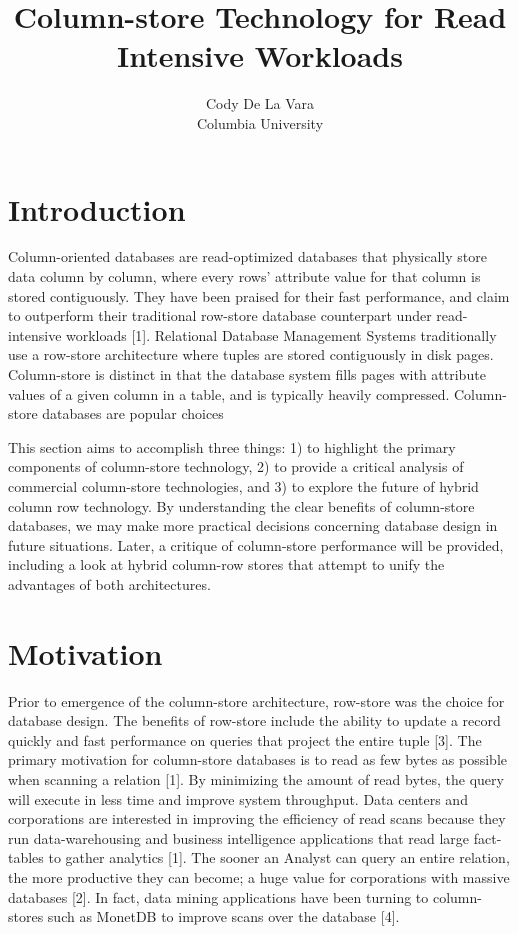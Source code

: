 \documentclass[11pt]{article}
\begin{document}
\title{Column-store Technology for Read Intensive Workloads}
\author{Cody De La Vara\\Columbia University}
\maketitle
\section{Introduction}
Column-oriented databases are read-optimized databases that physically store data column by column, where every rows' attribute value for that column is stored contiguously. They have been praised for their fast performance, and claim to outperform their traditional row-store database counterpart under read-intensive workloads [1]. Relational Database Management Systems traditionally use a row-store architecture where tuples are stored contiguously in disk pages. Column-store is distinct in that the database system fills pages with attribute values of a given column in a table, and is typically heavily compressed. Column-store databases are popular choices 

This section aims to accomplish three things: 1) to highlight the primary components of column-store technology, 2) to provide a critical analysis of commercial column-store technologies, and 3) to explore the future of hybrid column row technology. By understanding the clear benefits of column-store databases, we may make more practical decisions concerning database design in  future situations. Later, a critique of column-store performance will be provided, including a look at hybrid column-row stores that attempt to unify the advantages of both architectures. 

\section{Motivation}
Prior to emergence of the column-store architecture, row-store was the choice for database design. The benefits of row-store include the ability to update a record quickly and fast performance on queries that project the entire tuple [3]. The primary motivation for column-store databases is to read as few bytes as possible when scanning a relation [1]. By minimizing the amount of read bytes, the query will execute in less time and improve system throughput. Data centers and corporations are interested in improving the efficiency of read scans because they run data-warehousing and business intelligence applications that read large fact-tables to gather analytics [1]. The sooner an Analyst can query an entire relation, the more productive they can become; a huge value for corporations with massive databases [2]. In fact, data mining applications have been turning to column-stores such as MonetDB to improve scans over the database [4]. 
\end{document}
